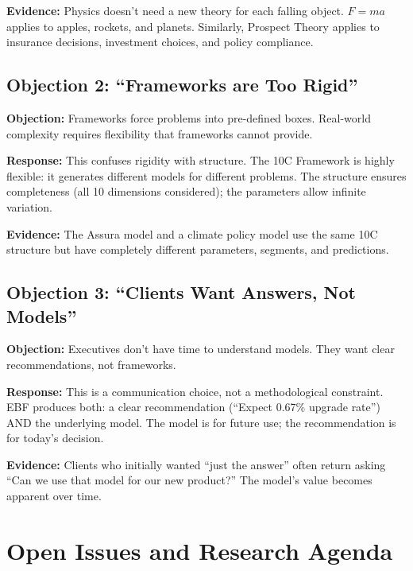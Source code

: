 \textbf{Evidence:} Physics doesn't need a new theory for each falling object. $F = ma$ applies to apples, rockets, and planets. Similarly, Prospect Theory applies to insurance decisions, investment choices, and policy compliance.

\subsection{Objection 2: ``Frameworks are Too Rigid''}

\textbf{Objection:} Frameworks force problems into pre-defined boxes. Real-world complexity requires flexibility that frameworks cannot provide.

\textbf{Response:} This confuses rigidity with structure. The 10C Framework is highly flexible: it generates different models for different problems. The structure ensures completeness (all 10 dimensions considered); the parameters allow infinite variation.

\textbf{Evidence:} The Assura model and a climate policy model use the same 10C structure but have completely different parameters, segments, and predictions.

\subsection{Objection 3: ``Clients Want Answers, Not Models''}

\textbf{Objection:} Executives don't have time to understand models. They want clear recommendations, not frameworks.

\textbf{Response:} This is a communication choice, not a methodological constraint. EBF produces both: a clear recommendation (``Expect 0.67\% upgrade rate'') AND the underlying model. The model is for future use; the recommendation is for today's decision.

\textbf{Evidence:} Clients who initially wanted ``just the answer'' often return asking ``Can we use that model for our new product?'' The model's value becomes apparent over time.


\section{Open Issues and Research Agenda}
\label{sec:fm-open}

